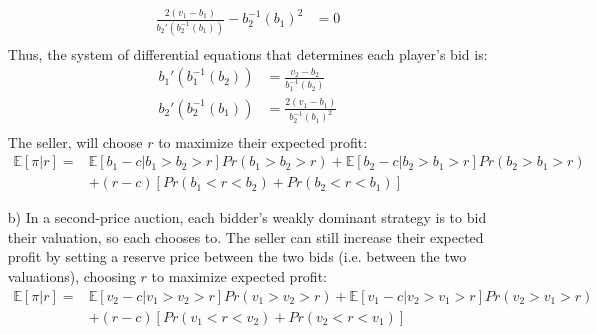 \documentclass{article}
\newcommand{\E}[1]{\mathbb{E}\left[#1\right]} %
\begin{document}
\begin{itemize}
\begin{align*}
		\frac{2(v_1-b_1)}{b_2'\left(b_2^{-1}(b_1)\right)} - b_2^{-1}(b_1)^2 &= 0	\\
	\end{align*}
	Thus, the system of differential equations that determines each player's bid is:
	\begin{align*}
		b_1'\left(b_1^{-1}(b_2)\right)	&= \frac{v_2-b_2}{b_1^{-1}(b_2) }		\\
		b_2'\left(b_2^{-1}(b_1)\right)	&= \frac{2(v_1-b_1)}{b_2^{-1}(b_1)^2}	\\
	\end{align*}
	The seller, will choose $r$ to maximize their expected profit:
	{\small \begin{align*}
		\E{\pi|r} = &\E{b_1-c|b_1>b_2>r}Pr(b_1>b_2>r) + \E{b_2-c|b_2>b_1>r}Pr(b_2>b_1>r) 	\\
					&+ (r-c)\left[Pr(b_1<r<b_2) + Pr(b_2<r<b_1)\right]
	\end{align*} }
	
	\item[b)] In a second-price auction, each bidder's weakly dominant strategy is to bid their valuation, so each chooses to. The seller can still increase their expected profit by setting a reserve price between the two bids (i.e. between the two valuations), choosing $r$ to maximize expected profit:
	{\small \begin{align*}
		\E{\pi|r} = &\E{v_2-c|v_1>v_2>r}Pr(v_1>v_2>r) + \E{v_1-c|v_2>v_1>r}Pr(v_2>v_1>r) 	\\
					&+ (r-c)\left[Pr(v_1<r<v_2) + Pr(v_2<r<v_1)\right]
	\end{align*} }
	


\end{itemize}
\end{document}
